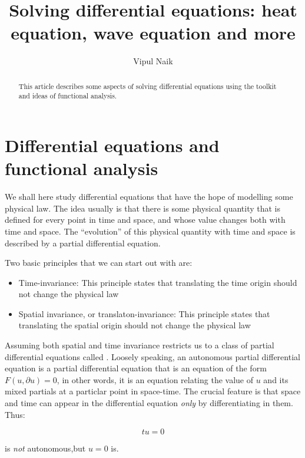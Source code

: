 \documentclass[a4paper]{amsart}
\title{Solving differential equations: heat equation, wave equation and more}
\author{Vipul Naik}
\begin{document}
\maketitle

\begin{abstract}
  This article describes some aspects of solving differential
  equations using the toolkit and ideas of functional analysis.
\end{abstract}

\section{Differential equations and functional analysis}

We shall here study differential equations that have the hope of
modelling some physical law. The idea usually is that there is some
physical quantity that is defined for every point in time and space,
and whose value changes both with time and space. The ``evolution'' of
this physical quantity with time and space is described by a partial
differential equation.

Two basic principles that we can start out with are:

\begin{itemize}

\item Time-invariance: This principle states that translating the time
  origin should not change the physical law

\item Spatial invariance, or translaton-invariance: This principle
  states that translating the spatial origin should not change the
  physical law

\end{itemize}

Assuming both spatial and time invariance restricts us to a class of
partial differential equations called . Loosely speaking, an autonomous
partial differential equation is a partial differential equation that
is an equation of the form $F(u,\partial u) = 0$, in other words, it
is an equation relating the value of $u$ and its mixed partials at a
particlar point in space-time. The crucial feature is that space and
time can appear in the differential equation {\em only} by
differentiating in them. Thus:

$$tu = 0$$

is {\em not} autonomous,but $u = 0$ is.
\end{document}

